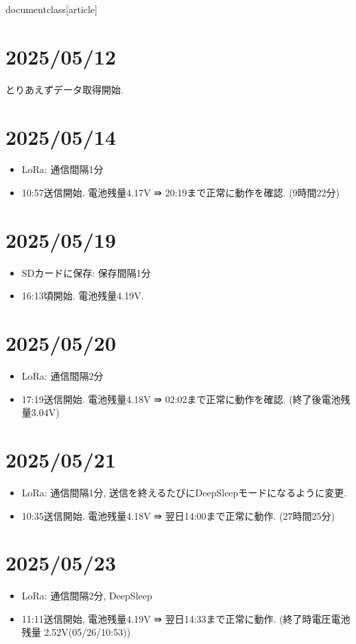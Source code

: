 documentclass[article]



\section{2025/05/12}
とりあえずデータ取得開始.


\section{2025/05/14}
\begin{itemize}
    \item LoRa: 通信間隔1分
    \item 10:57送信開始. 電池残量4.17V ⇛ 20:19まで正常に動作を確認. (9時間22分)
\end{itemize}

\section{2025/05/19}
\begin{itemize}
    \item SDカードに保存: 保存間隔1分
    \item 16:13頃開始. 電池残量4.19V.
\end{itemize}

\section{2025/05/20}
\begin{itemize}
    \item LoRa: 通信間隔2分
    \item 17:19送信開始. 電池残量4.18V ⇛ 02:02まで正常に動作を確認. (終了後電池残量3.04V)
\end{itemize}

\section{2025/05/21}
\begin{itemize}
    \item LoRa: 通信間隔1分, 送信を終えるたびにDeepSleepモードになるように変更.
    \item 10:35送信開始. 電池残量4.18V ⇛ 翌日14:00まで正常に動作. (27時間25分)
\end{itemize}

\section{2025/05/23}
\begin{itemize}
    \item LoRa: 通信間隔2分, DeepSleep
    \item 11:11送信開始, 電池残量4.19V ⇛ 翌日14:33まで正常に動作.  (終了時電圧電池残量 2.52V(05/26/10:53))
\end{itemize}


